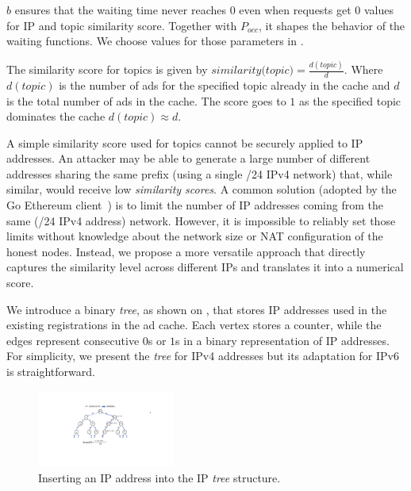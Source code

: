 $b$ ensures that the waiting time never reaches $0$ even when requests get $0$ values for IP and topic similarity score. Together with $P_\textit{occ}$, it shapes the behavior of the waiting functions. We choose values for those parameters in .

The similarity score for topics is given by $\textit{similarity(topic)}= \frac{d(topic)}{d}$.
Where $d(topic)$ is the number of ads for the specified topic already in the cache and $d$ is the total number of ads in the cache. 
The score goes to $1$ as the specified topic dominates the cache $d(topic) \approx d$. 

A simple similarity score used for topics cannot be securely applied to IP addresses. 
An attacker may be able to generate a large number of different addresses sharing the same prefix (\eg using a single /24 IPv4 network) that, while similar, would receive low \emph{similarity scores}. 
A common solution (\eg adopted by the Go Ethereum client~\cite{geth}) is to limit the number of IP addresses coming from the same (\eg /24 IPv4 address) network.
However, it is impossible to reliably set those limits without knowledge about the network size or NAT configuration of the honest nodes. 
Instead, we propose a more versatile approach that directly captures the similarity level across different IPs and translates it into a numerical score. 

We introduce a binary \emph{tree}, as shown on , that stores IP addresses used in the existing registrations in the ad cache.
Each vertex stores a counter, while the edges represent consecutive $0$s or $1$s in a binary representation of IP addresses.
For simplicity, we present the \emph{tree} for IPv4 addresses but its adaptation for IPv6 is straightforward.

\begin{figure}
    \centering
    \includegraphics[width=0.40\textwidth]{img/ip_tree_small}
    \vspace{-0.05in}
    \caption{Inserting an IP address into the IP \emph{tree} structure.}
    \label{fig:ip_tree}
    \vspace{-0.15in}
\end{figure}

